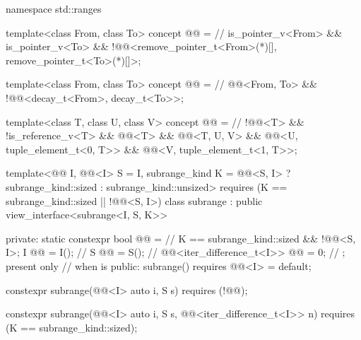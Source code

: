 %
\begin{codeblock}
namespace std::ranges {
  template<class From, class To>
    concept @@ =      // \expos
      is_pointer_v<From> && is_pointer_v<To> &&
      !@@<remove_pointer_t<From>(*)[], remove_pointer_t<To>(*)[]>;

  template<class From, class To>
    concept @@ =                    // \expos
      @@<From, To> &&
      !@@<decay_t<From>, decay_t<To>>;

  template<class T, class U, class V>
    concept @@ =                    // \expos
      !@@<T> && !is_reference_v<T> && @@<T> &&
      @@<T, U, V> &&
      @@<U, tuple_element_t<0, T>> &&
      @@<V, tuple_element_t<1, T>>;

  template<@@ I, @@<I> S = I, subrange_kind K =
      @@<S, I> ? subrange_kind::sized : subrange_kind::unsized>
    requires (K == subrange_kind::sized || !@@<S, I>)
  class subrange : public view_interface<subrange<I, S, K>> {
  private:
    static constexpr bool @@ =                       // \expos
      K == subrange_kind::sized && !@@<S, I>;
    I @@ = I();                                         // \expos
    S @@ = S();                                           // \expos
    @@<iter_difference_t<I>> @@ = 0;   // \expos; present only
                                                            // when  is 
  public:
    subrange() requires @@<I> = default;

    constexpr subrange(@@<I> auto i, S s) requires (!@@);

    constexpr subrange(@@<I> auto i, S s,
                       @@<iter_difference_t<I>> n)
      requires (K == subrange_kind::sized);

}}
\end{codeblock}
